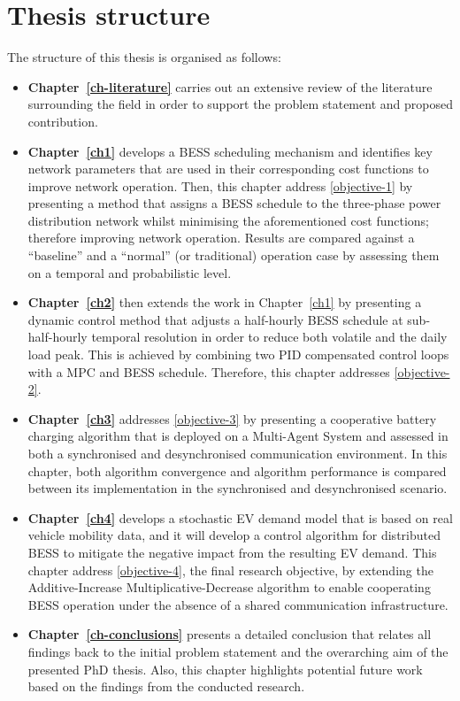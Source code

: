 \section{Thesis structure}
\label{ch-introduction:sec:thesis-structure}

The structure of this thesis is organised as follows:

\begin{itemize}
	\item
	\textbf{Chapter~\ref{ch-literature}} carries out an extensive review of the literature surrounding the field in order to support the problem statement and proposed contribution.
	\item
	\textbf{Chapter~\ref{ch1}} develops a BESS scheduling mechanism and identifies key network parameters that are used in their corresponding cost functions to improve network operation.
	Then, this chapter address \ref{objective-1} by presenting a method that assigns a BESS schedule to the three-phase power distribution network whilst minimising the aforementioned cost functions; therefore improving network operation.
	Results are compared against a ``baseline'' and a ``normal'' (or traditional) operation case by assessing them on a temporal and probabilistic level.
	\item
	\textbf{Chapter~\ref{ch2}} then extends the work in Chapter~\ref{ch1} by presenting a dynamic control method that adjusts a half-hourly BESS schedule at sub-half-hourly temporal resolution in order to reduce both volatile and the daily load peak.
	This is achieved by combining two PID compensated control loops with a MPC and BESS schedule.
	Therefore, this chapter addresses \ref{objective-2}.
	\item
	\textbf{Chapter~\ref{ch3}} addresses \ref{objective-3} by presenting a cooperative battery charging algorithm that is deployed on a Multi-Agent System and assessed in both a synchronised and desynchronised communication environment.
	In this chapter, both algorithm convergence and algorithm performance is compared between its implementation in the synchronised and desynchronised scenario.
	\item
	\textbf{Chapter~\ref{ch4}} develops a stochastic EV demand model that is based on real vehicle mobility data, and it will develop a control algorithm for distributed BESS to mitigate the negative impact from the resulting EV demand.
	This chapter address \ref{objective-4}, the final research objective, by extending the Additive-Increase Multiplicative-Decrease algorithm to enable cooperating BESS operation under the absence of a shared communication infrastructure.
	\item
	\textbf{Chapter~\ref{ch-conclusions}} presents a detailed conclusion that relates all findings back to the initial problem statement and the overarching aim of the presented PhD thesis.
	Also, this chapter highlights potential future work based on the findings from the conducted research.
\end{itemize}